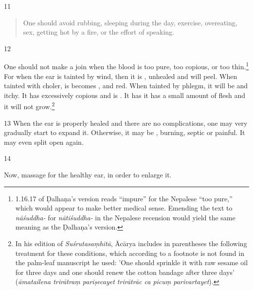 \begin{translation}
    \item[11]
    \begin{verse}
        One should avoid rubbing, sleeping during the day, exercise, overeating,
        sex, getting hot by a fire, or the effort of speaking.
    \end{verse}
    
    \item[12]
    
    One should not make a join when the blood is too pure, too copious, or too
    thin.\footnote{1.16.17 of Ḍalhaṇa's version \citep[79]{vulgate} reads “impure” for the Nepalese “too pure,” which would
    appear to make better medical sense.  Emending the text to \emph{nāśuddha-} for
    \emph{nātiśuddha-} in the Nepalese recension would yield the same meaning as the
    Ḍalhaṇa's version.} For when the ear is tainted by wind, then it is
    , unhealed and will peel. When tainted with
    choler, is becomes ,  and red.  When tainted
    by phlegm, it will be  and itchy.  It has excessively copious
     and is .  It has it has a small
    amount of  flesh and it will not grow.\footnote{In his edition of \emph{Suśrutasaṃhitā}, Ācārya \citep[79 n. 1]{vulgate} includes in parentheses the following treatment for these conditions, which according to a footnote is not found in the palm-leaf manuscript he used: 'One should sprinkle it with raw sesame oil for three days and one should renew the cotton bandage after three days' (\emph{āmatailena trirātraṃ pariṣecayet trirātrāc ca picuṃ parivartayet}).}
    
    \item[13] When the ear is properly healed and there are no complications,  one may
    very gradually start to expand it.  Otherwise, it may be ,
    burning, septic or painful.  It may even split open again.
    
    
    \item [14]
    
    
    Now, massage for the healthy ear, in order to enlarge it. 
    
  
    

\end{translation}
